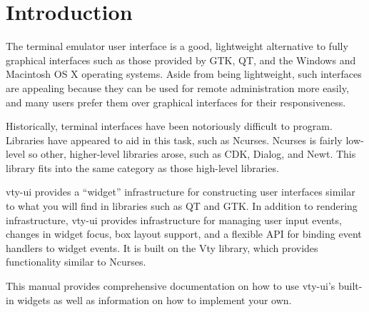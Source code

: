 \chapter{Introduction}

The terminal emulator user interface is a good, lightweight
alternative to fully graphical interfaces such as those provided by
GTK, QT, and the Windows and Macintosh OS X operating systems.  Aside
from being lightweight, such interfaces are appealing because they can
be used for remote administration more easily, and many users prefer
them over graphical interfaces for their responsiveness.

Historically, terminal interfaces have been notoriously difficult to
program.  Libraries have appeared to aid in this task, such as
Ncurses.  Ncurses is fairly low-level so other, higher-level libraries
arose, such as CDK, Dialog, and Newt.  This library fits into the same
category as those high-level libraries.

vty-ui provides a “widget” infrastructure for constructing user
interfaces similar to what you will find in libraries such as QT and
GTK.  In addition to rendering infrastructure, vty-ui provides
infrastructure for managing user input events, changes in widget focus,
box layout support, and a flexible API for binding event handlers to
widget events.  It is built on the Vty library, which provides
functionality similar to Ncurses.

This manual provides comprehensive documentation on how to use
vty-ui's built-in widgets as well as information on how to implement
your own.



